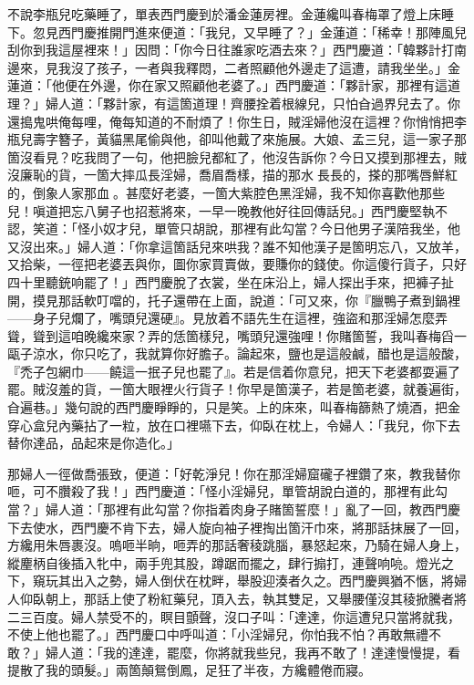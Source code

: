 不說李瓶兒吃藥睡了，單表西門慶到於潘金蓮房裡。金蓮纔叫春梅罩了燈上床睡下。忽見西門慶推開門進來便道：{}「我兒，又早睡了？」金蓮道：「稀幸！那陣風兒刮你到我這屋裡來！」因問：「你今日往誰家吃酒去來？」西門慶道：「韓夥計打南邊來，見我沒了孩子，一者與我釋悶，二者照顧他外邊走了這遭，請我坐坐。」金蓮道：「他便在外邊，你在家又照顧他老婆了。」西門慶道：「夥計家，那裡有這道理？」婦人道：「夥計家，有這箇道理！齊腰拴着根線兒，只怕㒲過界兒去了。你還搗鬼哄俺每哩，俺每知道的不耐煩了！你生日，賊淫婦他沒在這裡？你悄悄把李瓶兒壽字簪子，{}黃貓黑尾偷與他，卻叫他戴了來施展。大娘、孟三兒，這一家子那箇沒看見？吃我問了一句，他把臉兒都紅了，他沒告訴你？今日又摸到那裡去，賊沒廉恥的貨，一箇大摔瓜長淫婦，喬眉喬樣，描的那水𩬆長長的，搽的那嘴唇鮮紅的，倒象人家那血𣬼。甚麼好老婆，一箇大紫腔色黑淫婦，我不知你喜歡他那些兒！{}嗔道把忘八舅子也招惹將來，一早一晚教他好往回傳話兒。」西門慶堅執不認，笑道：「怪小奴才兒，單管只胡說，那裡有此勾當？今日他男子漢陪我坐，他又沒出來。」婦人道：「你拿這箇話兒來哄我？誰不知他漢子是箇明忘八，又放羊，又拾柴，一徑把老婆丟與你，圖你家買賣做，要賺你的錢使。{}你這傻行貨子，只好四十里聽銃响罷了！」西門慶脫了衣裳，坐在床沿上，婦人探出手來，把褲子扯開，{}摸見那話軟叮噹的，托子還帶在上面，說道：「可又來，你『臘鴨子煮到鍋裡——身子兒爛了，嘴頭兒還硬』。見放着不語先生在這裡，{}強盜和那淫婦怎麼弄聳，聳到這咱晚纔來家？弄的恁箇樣兒，嘴頭兒還強哩！你賭箇誓，我叫春梅舀一甌子涼水，你只吃了，我就算你好膽子。{}論起來，鹽也是這般鹹，醋也是這般酸，『禿子包網巾——饒這一抿子兒也罷了』。若是信着你意兒，把天下老婆都耍遍了罷。賊沒羞的貨，一箇大眼裡火行貨子！你早是箇漢子，若是箇老婆，就養遍街，㒲遍巷。」幾句說的西門慶睜睜的，只是笑。上的床來，叫春梅篩熱了燒酒，把金穿心盒兒內藥拈了一粒，放在口裡嚥下去，仰臥在枕上，令婦人：「我兒，你下去替你達品，品起來是你造化。」

那婦人一徑做喬張致，便道：「好乾淨兒！你在那淫婦窟礲子裡鑽了來，教我替你咂，可不臢殺了我！」西門慶道：「怪小淫婦兒，單管胡說白道的，那裡有此勾當？」婦人道：「那裡有此勾當？你指着肉身子賭箇誓麼！」亂了一回，教西門慶下去使水，西門慶不肯下去，婦人旋向袖子裡掏出箇汗巾來，將那話抹展了一回，{}方纔用朱唇裹沒。{}嗚咂半晌，咂弄的那話奢稜跳腦，暴怒起來，乃騎在婦人身上，縱麈柄自後插入牝中，兩手兜其股，蹲踞而擺之，肆行搧打，連聲响喨。燈光之下，窺玩其出入之勢，婦人倒伏在枕畔，舉股迎湊者久之。西門慶興猶不愜，將婦人仰臥朝上，那話上使了粉紅藥兒，頂入去，執其雙足，又舉腰僅沒其稜掀騰者將二三百度。婦人禁受不的，瞑目顫聲，沒口子叫：「達達，你這遭兒只當將就我，不使上他也罷了。」西門慶口中呼叫道：「小淫婦兒，你怕我不怕？再敢無禮不敢？」婦人道：「我的達達，罷麼，你將就我些兒，我再不敢了！達達慢慢提，看提散了我的頭髮。」兩箇顛鴛倒鳳，足狂了半夜，方纔體倦而寢。

